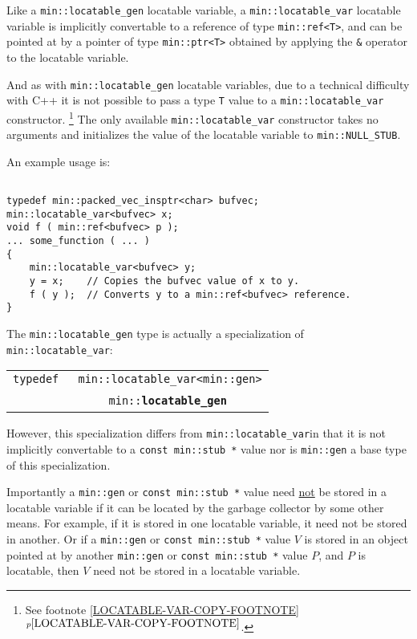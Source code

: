 \documentclass[12pt]{article}
\makeatletter
\newcommand{\ttindex}[1]{\index{#1@{\tt #1}}}
\newcommand{\minindex}[1]{\ttindex{min::#1}\ttindex{#1}}
\newcommand{\itemref}[1]{\ref{#1}$^{p\pageref{#1}}$}
\newcommand{\EOL}{\penalty \exhyphenpenalty}
\newenvironment{indpar}[1][0.3in]%
	{\begin{list}{}%
		     {\setlength{\itemsep}{0in}%
		      \setlength{\topsep}{0in}%
		      \setlength{\parsep}{1ex}%
		      \setlength{\labelwidth}{#1}%
		      \setlength{\leftmargin}{#1}%
		      \addtolength{\leftmargin}{\labelsep}}%
	 \item}%
	{\end{list}}
\newcommand{\LABEL}[1]{\label{#1}}
\newcommand{\ARGBREAK}{\\&{\tt ~~~~}}
\newcommand{\MINKEY}[1]{{\tt \bf #1}\minindex{#1}}
\makeatother
\begin{document}
Like a {\tt min::\EOL locatable\_\EOL gen} locatable variable,
a {\tt min::\EOL locatable\_\EOL var\TARG} locatable variable
is implicitly convertable to a
reference of type {\tt min::\EOL ref<T>}, and can be pointed at
by a pointer of type {\tt min::\EOL ptr<T>} obtained by applying
the {\tt \&} operator to the locatable variable.

And as with {\tt min::\EOL locatable\_\EOL gen} locatable variables,
due to a technical difficulty with C++ it is not possible to pass a
type {\tt T} value to a {\tt min::\EOL locatable\_\EOL var\TARG} constructor.%
\footnote{See footnote \itemref{LOCATABLE-VAR-COPY-FOOTNOTE}.}
The only available {\tt min::locatable\_var\TARG} constructor takes
no arguments and initializes the value of the locatable variable
to {\tt min::\EOL NULL\_\EOL STUB}.

An example usage is:

\begin{indpar}\begin{verbatim}

typedef min::packed_vec_insptr<char> bufvec;
min::locatable_var<bufvec> x;
void f ( min::ref<bufvec> p );
... some_function ( ... )
{
    min::locatable_var<bufvec> y;
    y = x;    // Copies the bufvec value of x to y.
    f ( y );  // Converts y to a min::ref<bufvec> reference.
}
\end{verbatim}\end{indpar}

The {\tt min::locatable\_gen} type is actually a specialization
of {\tt min::\EOL locatable\_\EOL var}:

\begin{indpar}[0.1in]\begin{tabular}{r@{}l}
\verb|typedef |
	& \verb|min::locatable_var<min::gen>|\ARGBREAK
	  \verb|min::|\MINKEY{locatable\_gen}
\LABEL{MIN::LOCATABLE_GEN_TYPEDEF} \\
\end{tabular}\end{indpar}

However, this specialization differs from
{\tt min::\EOL locatable\_\EOL var\TARG}in that it is not
implicitly convertable to a {\tt const min::\EOL stub~*} value nor
is {\tt min::gen} a base type of this specialization.

Importantly a \verb|min::gen| or \verb|const min::stub *|
value need \underline{not} be stored
in a locatable variable if it can be located by the garbage collector by some
other means.  For example, if it is stored in one locatable variable,
it need not be stored in another.  Or if a \verb|min::gen|
or {\tt const min::\EOL stub~*} value
$V$ is stored in an object pointed at by another \verb|min::gen|
or {\tt const min::\EOL stub~*}
value $P$, and $P$ is locatable, then $V$ need not
be stored in a locatable variable.
\end{document}
